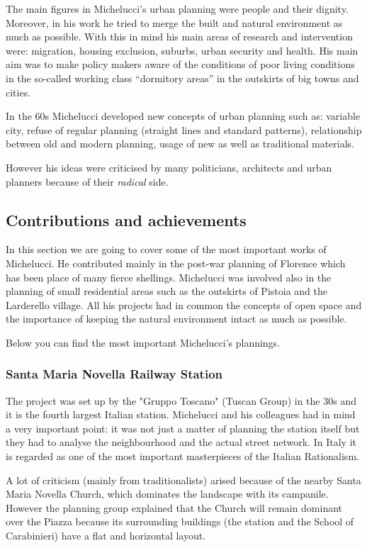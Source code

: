 \documentclass[a4paper,11pt]{article}
\begin{document}
The main figures in Michelucci's urban planning were people and their dignity.
Moreover, in his work he tried to merge the built and natural environment as much as possible.
With this in mind his main areas of research and intervention were: migration, housing exclusion, suburbs, urban security and health.
His main aim was to make policy makers aware of the conditions of poor living conditions in the so-called working class ``dormitory areas'' in the outskirts of big towns and cities.

In the 60s Michelucci developed new concepts of urban planning such as: variable city, refuse of regular planning (straight lines and standard patterns), relationship between old and modern planning, usage of new as well as traditional materials.

However his ideas were criticised by many politicians, architects and urban planners because of their \emph{radical} side.

\subsection*{Contributions and achievements}
In this section we are going to cover some of the most important works of Michelucci. He contributed mainly in the post-war planning of Florence which
has been place of many fierce shellings. Michelucci was involved also in the planning of small residential areas such as the outskirts of Pistoia and the Larderello village. All his projects had in common the concepts of open space and the importance of keeping the natural environment intact as much as possible.

Below you can find the most important Michelucci's plannings.

\subsubsection*{Santa Maria Novella Railway Station}
The project was set up by the "Gruppo Toscano" (Tuscan Group) in the 30s and it is the fourth largest Italian station. Michelucci and his colleagues had in mind a very important point: it was not just a matter of planning the station itself but they had to analyse the neighbourhood and the actual street network. In Italy it is regarded as one of the most important masterpieces of the Italian Rationalism.

A lot of criticism (mainly from traditionalists) arised because of the nearby Santa Maria Novella Church, which dominates the landscape with its campanile. However the planning group explained that the Church will remain dominant over the Piazza because its surrounding buildings (the station and the School of Carabinieri) have a flat and horizontal layout.
\end{document}
